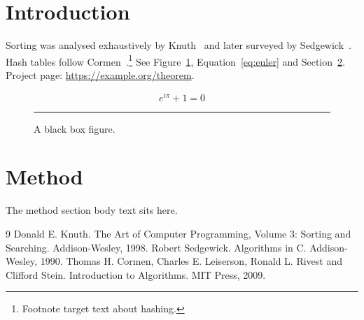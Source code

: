 \documentclass[twocolumn]{article}
\begin{document}
\section{Introduction}\label{sec:intro}
Sorting was analysed exhaustively by Knuth~\cite{knuth} and later
surveyed by Sedgewick~\cite{sedgewick}. Hash tables follow
Cormen~\cite{clrs}.\footnote{Footnote target text about hashing.}
See Figure~\ref{fig:box}, Equation~\ref{eq:euler} and
Section~\ref{sec:method}. Project page: \url{https://example.org/theorem}.

\begin{equation}\label{eq:euler}
e^{i\pi} + 1 = 0
\end{equation}

\begin{figure}[h]
\centering
\rule{3cm}{2cm}
\caption{A black box figure.}\label{fig:box}
\end{figure}

\section{Method}\label{sec:method}
The method section body text sits here.

\clearpage
\begin{thebibliography}{9}
 Donald E. Knuth. The Art of Computer Programming,
Volume 3: Sorting and Searching. Addison-Wesley, 1998.
 Robert Sedgewick. Algorithms in C. Addison-Wesley, 1990.
 Thomas H. Cormen, Charles E. Leiserson, Ronald L. Rivest
and Clifford Stein. Introduction to Algorithms. MIT Press, 2009.
\end{thebibliography}
\end{document}
